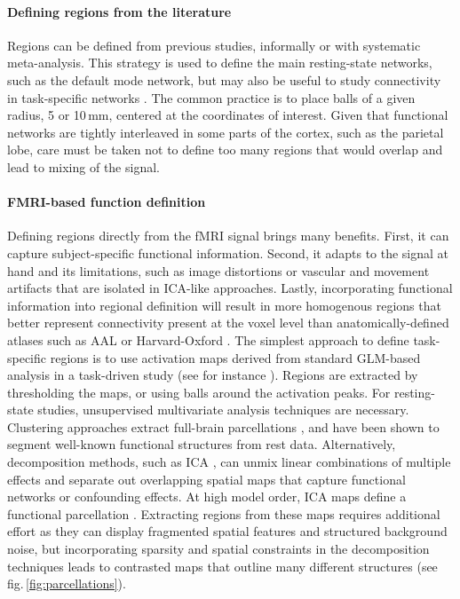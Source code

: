 \documentclass[5p]{elsarticle}
\begin{document}
\paragraph{Defining regions from the literature}
%
Regions can be defined from previous studies, informally or with
systematic meta-analysis. This strategy is used to define the main
resting-state networks, such as the default mode network, but may also be
useful to study connectivity in task-specific networks
\cite{biswal1995,rissman2004,dosenbach2006,grillon2012}. The common practice is to place balls of a given
radius, 5 or 10\,mm, centered at the coordinates of interest. Given that
functional networks are tightly interleaved in some parts of the cortex,
such as the parietal lobe, care must be taken not to define too many
regions that would overlap and lead to mixing of the signal.

\paragraph{FMRI-based function definition}
%
Defining regions directly from the fMRI signal brings many benefits.
First, it can capture subject-specific functional information. Second, it
adapts to the signal at hand and its limitations, such as
image distortions or vascular and movement artifacts that are isolated
in ICA-like approaches. Lastly, incorporating functional information into
regional definition will result in more homogenous regions that better represent
connectivity present at the voxel level than anatomically-defined atlases such
as AAL or Harvard-Oxford \cite{craddock2012}. The simplest approach to define task-specific
regions is to use activation maps derived from standard GLM-based
analysis in a task-driven study (see for instance \cite{poldrack2011}).
Regions are extracted by thresholding the maps, or using balls around the
activation peaks. For resting-state studies, unsupervised multivariate
analysis techniques are necessary. Clustering approaches extract
full-brain parcellations \cite{craddock2012,bellec2010,yeo2011,thirion2006}, and have been shown to segment well-known functional
structures from rest data. Alternatively, decomposition
methods, such as ICA \cite{beckmann2004}, can unmix linear
combinations of multiple effects and separate out overlapping spatial maps
that capture functional networks or confounding effects. At high model
order, ICA maps define a functional parcellation \cite{kiviniemi2009}.
Extracting regions from these maps requires additional effort as they can
display fragmented spatial features and structured background noise, but
incorporating sparsity and spatial constraints in the decomposition
techniques leads to contrasted maps that outline many different
structures \cite{varoquaux2012} (see fig.\,\ref{fig:parcellations}).
\end{document}
